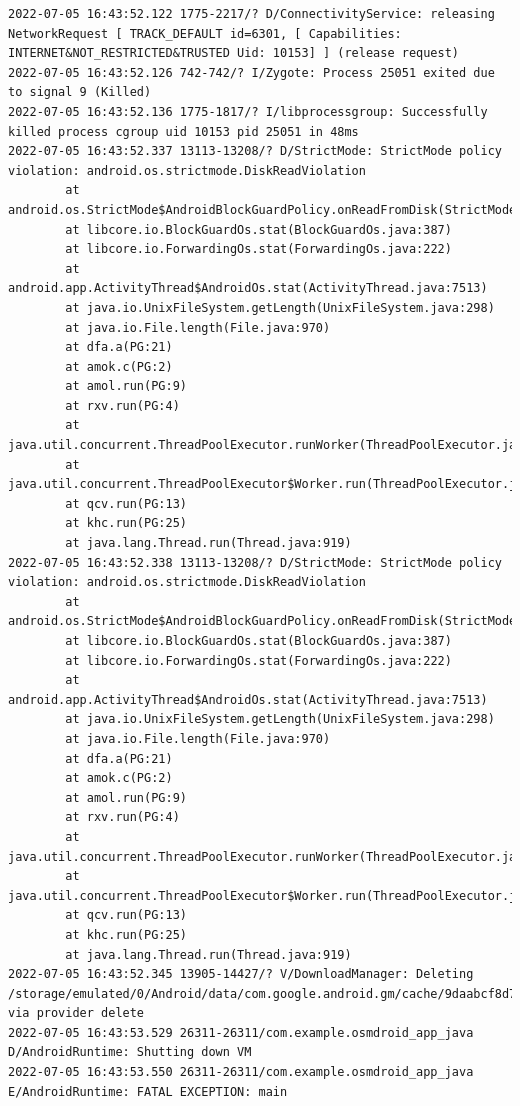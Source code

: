 \documentclass[a4paper,12pt]{book}
\begin{document}
\begin{lstlisting}
2022-07-05 16:43:52.122 1775-2217/? D/ConnectivityService: releasing NetworkRequest [ TRACK_DEFAULT id=6301, [ Capabilities: INTERNET&NOT_RESTRICTED&TRUSTED Uid: 10153] ] (release request)
2022-07-05 16:43:52.126 742-742/? I/Zygote: Process 25051 exited due to signal 9 (Killed)
2022-07-05 16:43:52.136 1775-1817/? I/libprocessgroup: Successfully killed process cgroup uid 10153 pid 25051 in 48ms
2022-07-05 16:43:52.337 13113-13208/? D/StrictMode: StrictMode policy violation: android.os.strictmode.DiskReadViolation
        at android.os.StrictMode$AndroidBlockGuardPolicy.onReadFromDisk(StrictMode.java:1571)
        at libcore.io.BlockGuardOs.stat(BlockGuardOs.java:387)
        at libcore.io.ForwardingOs.stat(ForwardingOs.java:222)
        at android.app.ActivityThread$AndroidOs.stat(ActivityThread.java:7513)
        at java.io.UnixFileSystem.getLength(UnixFileSystem.java:298)
        at java.io.File.length(File.java:970)
        at dfa.a(PG:21)
        at amok.c(PG:2)
        at amol.run(PG:9)
        at rxv.run(PG:4)
        at java.util.concurrent.ThreadPoolExecutor.runWorker(ThreadPoolExecutor.java:1167)
        at java.util.concurrent.ThreadPoolExecutor$Worker.run(ThreadPoolExecutor.java:641)
        at qcv.run(PG:13)
        at khc.run(PG:25)
        at java.lang.Thread.run(Thread.java:919)
2022-07-05 16:43:52.338 13113-13208/? D/StrictMode: StrictMode policy violation: android.os.strictmode.DiskReadViolation
        at android.os.StrictMode$AndroidBlockGuardPolicy.onReadFromDisk(StrictMode.java:1571)
        at libcore.io.BlockGuardOs.stat(BlockGuardOs.java:387)
        at libcore.io.ForwardingOs.stat(ForwardingOs.java:222)
        at android.app.ActivityThread$AndroidOs.stat(ActivityThread.java:7513)
        at java.io.UnixFileSystem.getLength(UnixFileSystem.java:298)
        at java.io.File.length(File.java:970)
        at dfa.a(PG:21)
        at amok.c(PG:2)
        at amol.run(PG:9)
        at rxv.run(PG:4)
        at java.util.concurrent.ThreadPoolExecutor.runWorker(ThreadPoolExecutor.java:1167)
        at java.util.concurrent.ThreadPoolExecutor$Worker.run(ThreadPoolExecutor.java:641)
        at qcv.run(PG:13)
        at khc.run(PG:25)
        at java.lang.Thread.run(Thread.java:919)
2022-07-05 16:43:52.345 13905-14427/? V/DownloadManager: Deleting /storage/emulated/0/Android/data/com.google.android.gm/cache/9daabcf8d77eb27de115e695d042a766 via provider delete
2022-07-05 16:43:53.529 26311-26311/com.example.osmdroid_app_java D/AndroidRuntime: Shutting down VM
2022-07-05 16:43:53.550 26311-26311/com.example.osmdroid_app_java E/AndroidRuntime: FATAL EXCEPTION: main

\end{lstlisting}
\end{document}
